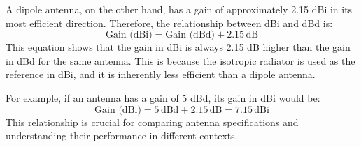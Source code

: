 A dipole antenna, on the other hand, has a gain of approximately 2.15 dBi in its most efficient direction. Therefore, the relationship between dBi and dBd is:
\[
\text{Gain (dBi)} = \text{Gain (dBd)} + 2.15 \, \text{dB}
\]
This equation shows that the gain in dBi is always 2.15 dB higher than the gain in dBd for the same antenna. This is because the isotropic radiator is used as the reference in dBi, and it is inherently less efficient than a dipole antenna.

For example, if an antenna has a gain of 5 dBd, its gain in dBi would be:
\[
\text{Gain (dBi)} = 5 \, \text{dBd} + 2.15 \, \text{dB} = 7.15 \, \text{dBi}
\]
This relationship is crucial for comparing antenna specifications and understanding their performance in different contexts.


